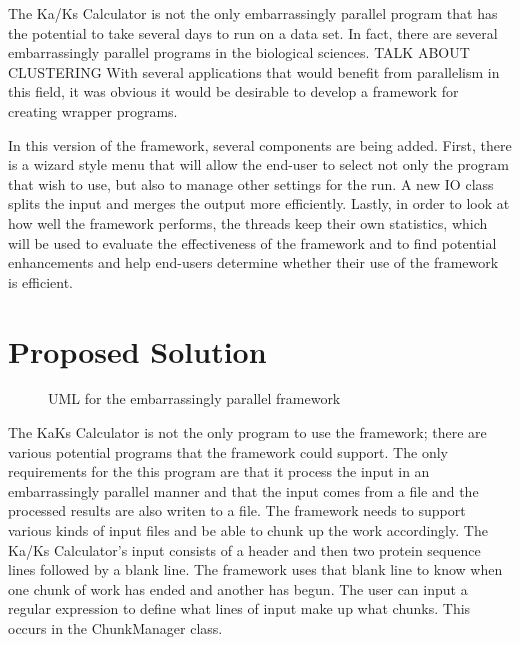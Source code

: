 \documentclass[12pt]{article}
\begin{document}
The Ka/Ks Calculator is not the only embarrassingly parallel program that has the
potential to take several days to run on a data set. In fact, there are several
embarrassingly parallel programs in the biological sciences. 
TALK ABOUT CLUSTERING
With several applications that 
would benefit from parallelism in this field, it was obvious it would be 
desirable to develop a framework for creating wrapper programs.


In this version of the framework, several components are being added. First, 
there is a wizard style menu that will allow the end-user to select not only the 
program that wish to use, but also to manage other settings for the run. A new 
IO class splits the input and merges the output more efficiently. Lastly, in 
order to look at how well the framework performs, the threads keep their own 
statistics, which will be used to evaluate the effectiveness of the framework 
and to find potential enhancements and help end-users determine whether their 
use of the framework is efficient.

\section{Proposed Solution}
\begin{figure}
{}
\caption{UML for the embarrassingly parallel framework}
\label{fig:uml}
\end{figure}
The KaKs Calculator is not the only program to use the framework; there are
various potential programs that the framework could support. The only 
requirements for the this program are that it process the input in an 
embarrassingly parallel manner and that the input comes from a file and the 
processed results are also writen to a file. The framework needs to support 
various kinds of input files and be able to chunk up the work accordingly. The 
Ka/Ks Calculator's input consists of a header and then two protein sequence 
lines followed by a blank line. The framework uses that blank line to know when 
one chunk of work has ended and another has begun. The user can input a regular 
expression to define what lines of input make up what chunks. This occurs in 
the ChunkManager class. 
\end{document}
